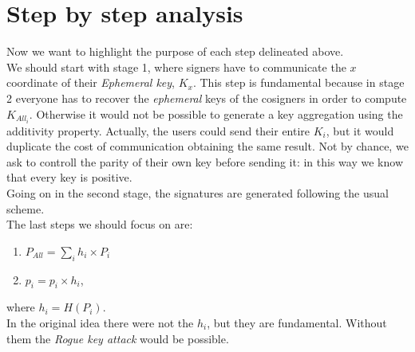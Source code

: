 \section{Step by step analysis}
Now we want to highlight the purpose of each step delineated above.\\
We should start with stage 1, where signers have to communicate the $x$ coordinate of their \textit{Ephemeral key}, $K_{x}$. This step is fundamental because in stage 2 everyone has to recover the \textit{ephemeral} keys of the cosigners in order to compute $K_{All_{i}}$. Otherwise it would not be possible to generate a key aggregation using the additivity property. Actually, the users could send their entire $K_{i}$, but it would duplicate the cost of communication obtaining the same result. Not by chance, we ask to controll the parity of their own key before sending it: in this way we know that every key is positive.\\
Going on in the second stage, the signatures are generated following the usual scheme.\\
The last steps we should focus on are:
\begin{enumerate}
	\item $P_{All}=\sum_{i} h_{i}\times P_{i}$
	\item $p_{i}=p_{i}\times h_{i}$,
\end{enumerate}
where $h_{i}=H(P_{i})$.\\
In the original idea there were not the $h_{i}$, but they are fundamental. Without them the \textit{Rogue key attack} would be possible.
